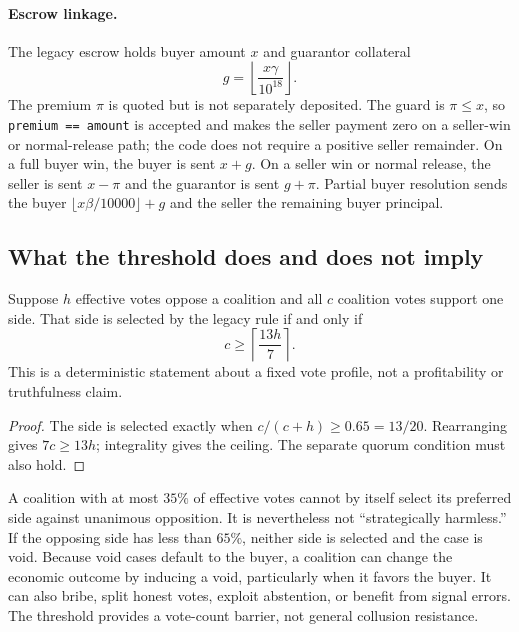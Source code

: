 \paragraph{Escrow linkage.}
The legacy escrow holds buyer amount $x$ and guarantor collateral
\[
  g=\left\lfloor\frac{x\gamma}{10^{18}}\right\rfloor.
\]
The premium $\pi$ is quoted but is not separately deposited.
The guard is $\pi\le x$, so \texttt{premium == amount} is accepted and makes the seller payment zero
on a seller-win or normal-release path; the code does not require a positive seller remainder. On a
full buyer win, the buyer is sent $x+g$. On a seller win or normal release, the seller is sent
$x-\pi$ and the guarantor is sent $g+\pi$. Partial buyer resolution sends the buyer
$\lfloor x\beta/10000\rfloor+g$ and the seller the remaining buyer principal.

\subsection{What the threshold does and does not imply}
\label{sec:analysis}

\begin{proposition}
\label{prop:threshold}
Suppose $h$ effective votes oppose a coalition and all $c$ coalition votes support one side. That
side is selected by the legacy rule if and only if
\[
 c\ge\left\lceil\frac{13h}{7}\right\rceil.
\]
This is a deterministic statement about a fixed vote profile, not a profitability or truthfulness
claim.
\end{proposition}

\begin{proof}
The side is selected exactly when $c/(c+h)\ge0.65=13/20$. Rearranging gives $7c\ge13h$;
integrality gives the ceiling. The separate quorum condition must also hold.
\end{proof}

A coalition with at most $35\%$ of effective votes cannot by itself select its preferred side against
unanimous opposition. It is nevertheless not ``strategically harmless.'' If the opposing side has
less than $65\%$, neither side is selected and the case is void. Because void cases default to the
buyer, a coalition can change the economic outcome by inducing a void, particularly when it favors
the buyer. It can also bribe, split honest votes, exploit abstention, or benefit from signal errors.
The threshold provides a vote-count barrier, not general collusion resistance.

